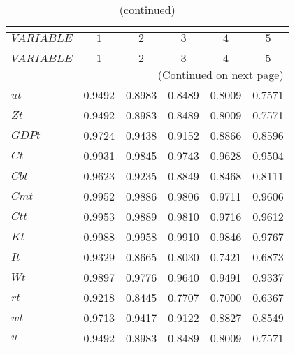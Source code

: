  
\begin{center}
\begin{longtable}{lccccc} 
\caption{AUTOCORRELATION OF SIMULATED VARIABLES}\\
 \label{Table:sim_autocorr_matrix}\\
\toprule 
$VARIABLE  $	 & 	 $         1$	 & 	 $         2$	 & 	 $         3$	 & 	 $         4$	 & 	 $         5$\\
\midrule \endfirsthead 
\caption{(continued)}\\
 \toprule \\ 
$VARIABLE  $	 & 	 $         1$	 & 	 $         2$	 & 	 $         3$	 & 	 $         4$	 & 	 $         5$\\
\midrule \endhead 
\midrule \multicolumn{6}{r}{(Continued on next page)} \\ \bottomrule \endfoot 
\bottomrule \endlastfoot 
$ut        $	 & 	    0.9492	 & 	    0.8983	 & 	    0.8489	 & 	    0.8009	 & 	    0.7571 \\ 
$Zt        $	 & 	    0.9492	 & 	    0.8983	 & 	    0.8489	 & 	    0.8009	 & 	    0.7571 \\ 
$GDPt      $	 & 	    0.9724	 & 	    0.9438	 & 	    0.9152	 & 	    0.8866	 & 	    0.8596 \\ 
$Ct        $	 & 	    0.9931	 & 	    0.9845	 & 	    0.9743	 & 	    0.9628	 & 	    0.9504 \\ 
$Cbt       $	 & 	    0.9623	 & 	    0.9235	 & 	    0.8849	 & 	    0.8468	 & 	    0.8111 \\ 
$Cmt       $	 & 	    0.9952	 & 	    0.9886	 & 	    0.9806	 & 	    0.9711	 & 	    0.9606 \\ 
$Ctt       $	 & 	    0.9953	 & 	    0.9889	 & 	    0.9810	 & 	    0.9716	 & 	    0.9612 \\ 
$Kt        $	 & 	    0.9988	 & 	    0.9958	 & 	    0.9910	 & 	    0.9846	 & 	    0.9767 \\ 
$It        $	 & 	    0.9329	 & 	    0.8665	 & 	    0.8030	 & 	    0.7421	 & 	    0.6873 \\ 
$Wt        $	 & 	    0.9897	 & 	    0.9776	 & 	    0.9640	 & 	    0.9491	 & 	    0.9337 \\ 
$rt        $	 & 	    0.9218	 & 	    0.8445	 & 	    0.7707	 & 	    0.7000	 & 	    0.6367 \\ 
$wt        $	 & 	    0.9713	 & 	    0.9417	 & 	    0.9122	 & 	    0.8827	 & 	    0.8549 \\ 
$u         $	 & 	    0.9492	 & 	    0.8983	 & 	    0.8489	 & 	    0.8009	 & 	    0.7571 \\ 

\end{longtable}
\end{center}
